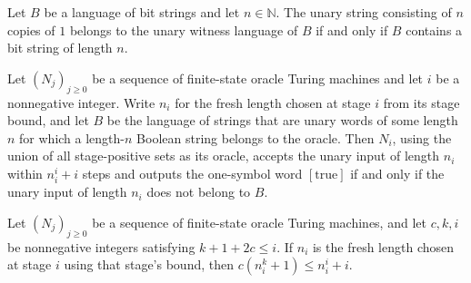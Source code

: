 \begin{theorem}
\label{Complexity.mem_unaryWitnessLang_replicate}
\leanok
{}
Let $B$ be a language of bit strings and let $n\in\mathbb{N}$. The unary string
consisting of $n$ copies of $1$ belongs to the unary witness language of $B$ if and only
if $B$ contains a bit string of length $n$.
\end{theorem}

\begin{theorem}
\label{Complexity.stage_flip}
\leanok
{}
Let $(N_j)_{j\ge0}$ be a sequence of finite-state oracle Turing machines and let $i$ be
a nonnegative integer. Write $n_i$ for the fresh length chosen at stage $i$ from its
stage bound, and let $B$ be the language of strings that are unary words of some length
$n$ for which a length-$n$ Boolean string belongs to the oracle. Then $N_i$, using the
union of all stage-positive sets as its oracle, accepts the unary input of length $n_i$
within $n_i^i+i$ steps and outputs the one-symbol word $[\mathrm{true}]$ if and only if
the unary input of length $n_i$ does not belong to $B$.
\end{theorem}

\begin{theorem}
\label{Complexity.stage_dominates}
\leanok
{}
Let $(N_j)_{j\ge0}$ be a sequence of finite-state oracle Turing machines, and let
$c,k,i$ be nonnegative integers satisfying $k+1+2c\le i$. If $n_i$ is the fresh length
chosen at stage $i$ using that stage's bound, then $c(n_i^k+1)\le n_i^i+i$.
\end{theorem}

